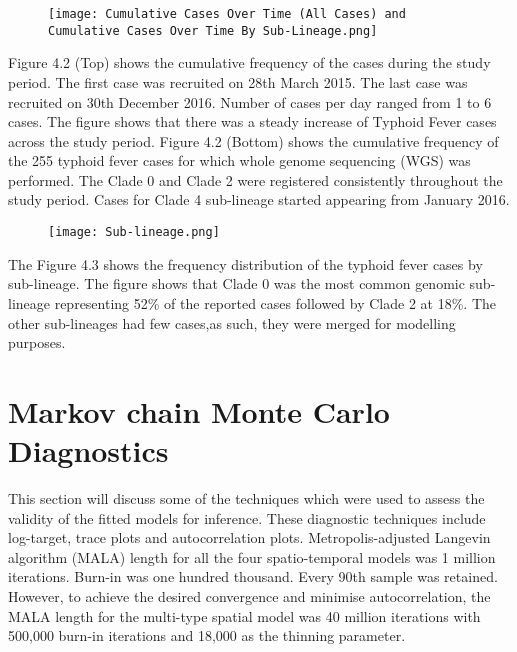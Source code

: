 \documentclass[a4paper]{thesis}
\begin{document}
\begin{figure}[H]
\begin{center}
\texttt{[image: Cumulative Cases Over Time (All Cases) and Cumulative Cases Over Time By Sub-Lineage.png]}
\end{center}
\end{figure}

Figure 4.2 (Top) shows the cumulative frequency of the cases during the study period. The first case was
recruited on 28th March 2015. The last case was recruited on 30th December 2016. Number of cases per day ranged from 1 to 6 cases. The figure shows that there was a steady increase of Typhoid Fever cases across the study period. Figure 4.2 (Bottom) shows the cumulative frequency of the 255 typhoid fever cases for which whole genome
sequencing (WGS) was performed. The Clade 0 and Clade 2 were registered consistently throughout the
study period. Cases for Clade 4 sub-lineage started appearing from January 2016. \\


\begin{figure}[H]
\begin{center}
\texttt{[image: Sub-lineage.png]}
\end{center}
\end{figure}

The Figure 4.3 shows the frequency distribution of the typhoid fever cases by sub-lineage. The figure shows that Clade 0 was the most common genomic sub-lineage representing 52\% of the reported cases followed by Clade 2 at 18\%. The other sub-lineages had few cases,as such, they were merged for modelling purposes.

\section{Markov chain Monte Carlo Diagnostics}

This section will discuss some of the techniques which were used to assess the validity of the fitted models for inference. These diagnostic techniques include log-target, trace plots and autocorrelation plots. Metropolis-adjusted Langevin algorithm
(MALA) length for all the four spatio-temporal models was 1 million iterations. Burn-in was one hundred thousand. Every 90th sample was retained. However, to achieve the desired convergence and minimise autocorrelation, the MALA length for the multi-type spatial model was 40 million iterations with 500,000 burn-in iterations and 18,000 as the thinning parameter.
\end{document}
